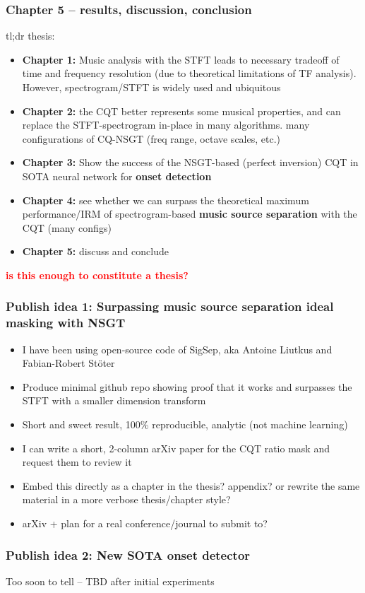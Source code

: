 \documentclass[usenames,dvipsnames]{beamer}
\begin{document}
\begin{frame}
	\frametitle{Chapter 5 -- results, discussion, conclusion}
	tl;dr thesis:
	\begin{itemize}
		\item
			\textbf{Chapter 1:} Music analysis with the STFT leads to necessary tradeoff of time and frequency resolution (due to theoretical limitations of TF analysis). However, spectrogram/STFT is widely used and ubiquitous
		\item
			\textbf{Chapter 2:} the CQT better represents some musical properties, and can replace the STFT-spectrogram in-place in many algorithms. many configurations of CQ-NSGT (freq range, octave scales, etc.)
		\item
			\textbf{Chapter 3:} Show the success of the NSGT-based (perfect inversion) CQT in SOTA neural network for \textbf{onset detection}
		\item
			\textbf{Chapter 4:} see whether we can surpass the theoretical maximum performance/IRM of spectrogram-based \textbf{music source separation} with the CQT (many configs)
		\item
			\textbf{Chapter 5:} discuss and conclude
	\end{itemize}
	\textcolor{red}{\textbf{is this enough to constitute a thesis?}}
\end{frame}

\begin{frame}
	\frametitle{\textbf{Publish idea 1}: Surpassing music source separation ideal masking with NSGT}
	\begin{itemize}
		\item
			I have been using open-source code of SigSep, aka Antoine Liutkus and Fabian-Robert St{\"o}ter
		\item
			Produce minimal github repo showing proof that it works and surpasses the STFT with a smaller dimension transform
		\item
			Short and sweet result, 100\% reproducible, analytic (not machine learning)
		\item
			I can write a short, 2-column arXiv paper for the CQT ratio mask and request them to review it
		\item
			Embed this directly as a chapter in the thesis? appendix? or rewrite the same material in a more verbose thesis/chapter style?
		\item
			arXiv + plan for a real conference/journal to submit to?
	\end{itemize}
\end{frame}

\begin{frame}
	\frametitle{\textbf{Publish idea 2}: New SOTA onset detector}
	Too soon to tell -- TBD after initial experiments
\end{frame}
\end{document}

